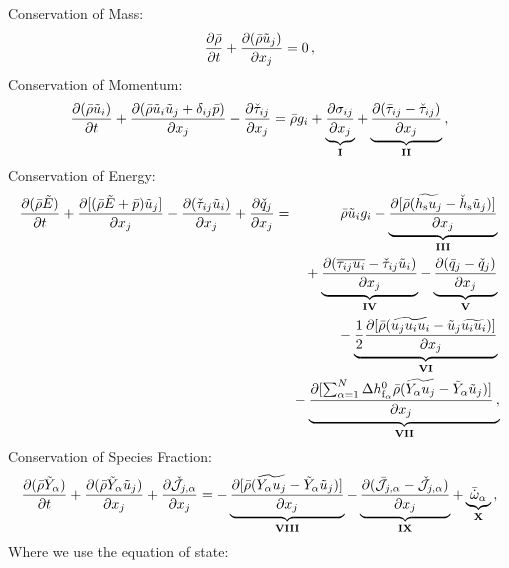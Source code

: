 \documentclass[titlepage,11pt,letterpaper]{article}
\begin{document}
Conservation of Mass:
\begin{equation}
  \label{eq:filt_mass} 
  \frac{\partial \bar{\rho}}{\partial t} + \frac{\partial (\bar{\rho} \tilde{u}_j )}{\partial x_j} = 0 \,,
\end{equation}
%
\indent Conservation of Momentum:
\begin{equation} 
  \label{eq:filt_momentum}
  \frac{\partial ( \bar{\rho} \tilde{u}_i )}{\partial t} 
  + \frac{\partial ( \bar{\rho} \tilde{u}_i \tilde{u}_j + \delta_{ij} \bar{p} )}{\partial x_j} 
  - \frac{\partial \check{\tau}_{ij}}{\partial x_j} 
  =  \bar{\rho} g_i 
  + \underbrace{\frac{\partial \sigma_{ij}}{\partial x_j}}_{\bf I}
  + \underbrace{\frac{\partial ( \bar{\tau}_{ij} - \check{\tau}_{ij} )}{\partial x_j}}_{\bf II} \,,
\end{equation}
%
\indent Conservation of Energy:
\begin{eqnarray}
  \label{eq:filt_energy}
  \Pfrac{( \bar{\rho} \tilde{E} )}{t} 
  + \Pfrac{[ (\bar{\rho} \tilde{E} + \bar{p}) \tilde{u}_j ]}{x_j}  
  - \Pfrac{( \check{\tau}_{ij} \tilde{u}_i )}{x_j}  
  + \Pfrac{\check{q}_j}{x_j} 
  & = & 
  \bar{\rho} \tilde{u}_i g_i
  - \underbrace{\Pfrac{[ \bar{\rho} (\widetilde{h_{\mathrm{s}} u_j} - \check{h}_{\mathrm{s}} \tilde{u}_j) ]}{x_j}
  }_{\bf III} 
  {} \nonumber \\  &  & {} 
  \!\!\!\!\! + \underbrace{\Pfrac{(\overline{\tau_{ij} u_i} - \check{\tau}_{ij} \tilde{u}_i)}{x_j}
  }_{\bf IV}
  - \underbrace{\Pfrac{(\bar{q}_j - \check{q}_j)}{x_j}}_{\bf V}
  {} \nonumber \\   &  & {} 
  \!\!\!\!\! - \underbrace{ \frac{1}{2} \Pfrac{[ \bar{\rho} (\widetilde{u_j u_i u_i}
      - \tilde{u}_j \widetilde{u_i u_i}) ]}{x_j}}_{\bf VI}
  {} \nonumber \\  &  & {}
  \!\!\!\!\! - \underbrace{\Pfrac{[ \sum_{\alpha=1}^N \Delta h^0_{\mathrm{f}_\alpha} \bar{\rho}
      (\widetilde{Y_\alpha u_{j}} - \tilde{Y}_\alpha \tilde{u}_j) ]}{x_j} \,,
  }_{\bf VII}
\end{eqnarray}
%
\indent Conservation of Species Fraction:
\begin{equation} 
  \label{eq:filt_species}
  \frac{\partial ( \bar{\rho} \tilde{Y}_\alpha )}{\partial t} 
  + \frac{\partial ( \bar{\rho} \tilde{Y}_\alpha \tilde{u}_j )}{\partial x_j}
  + \frac{\partial \check{\cal J}_{j,\alpha}}{\partial x_j} 
  = - \underbrace{\frac{\partial [ \bar{\rho}(\widetilde{Y_\alpha u_j} - 
                  \tilde{Y}_\alpha \tilde{u}_j) ]}{\partial x_j}}_{\bf VIII} 
  - \underbrace{\frac{\partial (\bar{\cal J}_{j,\alpha} - \check{\cal J}_{j,\alpha})}{\partial x_j}}_{\bf IX} 
  + \underbrace{\bar{\dot{\omega}}_\alpha}_{\bf X} \,,
\end{equation}
%
Where we use the equation of state:
\end{document}
